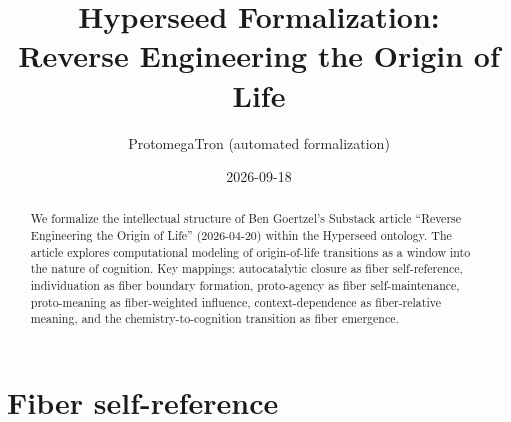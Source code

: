 \documentclass[11pt,a4paper]{article}
\title{Hyperseed Formalization:\\
  Reverse Engineering the Origin of Life}
\author{ProtomegaTron (automated formalization)}
\date{2026-09-18}
\begin{document}
\maketitle

\begin{abstract}
We formalize the intellectual structure of Ben Goertzel's Substack article
``Reverse Engineering the Origin of Life'' (2026-04-20) within the
Hyperseed ontology. The article explores computational modeling of
origin-of-life transitions as a window into the nature of cognition.
Key mappings: autocatalytic closure as fiber self-reference, individuation
as fiber boundary formation, proto-agency as fiber self-maintenance,
proto-meaning as fiber-weighted influence, context-dependence as
fiber-relative meaning, and the chemistry-to-cognition transition as
fiber emergence.
\end{abstract}

\tableofcontents

\section{Fiber self-reference}
\label{sec:self-reference}
\end{document}
